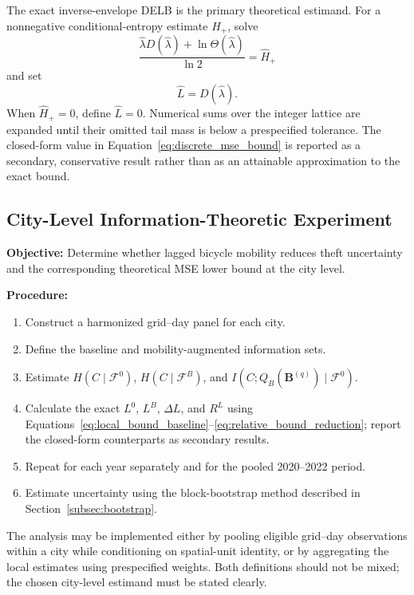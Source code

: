 \documentclass[applsci,article,submit,moreauthors]{Definitions/mdpi}
\begin{document}
The exact inverse-envelope DELB is the primary theoretical estimand. For a
nonnegative conditional-entropy estimate \(\widehat{H}_{+}\), solve
\begin{equation}
\frac{
\widehat{\lambda}D(\widehat{\lambda})
+
\ln\Theta(\widehat{\lambda})
}{\ln2}
=
\widehat{H}_{+}
\label{eq:numerical_inverse_envelope}
\end{equation}
and set
\begin{equation}
\widehat{L}
=
D(\widehat{\lambda}).
\label{eq:estimated_exact_delb}
\end{equation}
When \(\widehat{H}_{+}=0\), define \(\widehat{L}=0\). Numerical sums over
the integer lattice are expanded until their omitted tail mass is below a
prespecified tolerance. The closed-form value in
Equation~\eqref{eq:discrete_mse_bound} is reported as a secondary,
conservative result rather than as an attainable approximation to the exact
bound.

\subsection{City-Level Information-Theoretic Experiment}
\label{subsec:city_level_experiment}

\textbf{Objective:} Determine whether lagged bicycle mobility reduces theft uncertainty and the corresponding theoretical MSE lower bound at the city level.

\textbf{Procedure:}
\begin{enumerate}
    \item Construct a harmonized grid--day panel for each city.
    \item Define the baseline and mobility-augmented information sets.
    \item Estimate \(H(C\mid\mathcal{F}^{0})\), \(H(C\mid\mathcal{F}^{B})\), and \(I(C;Q_B(\mathbf{B}^{(q)})\mid\mathcal{F}^{0})\).
    \item Calculate the exact \(L^{0}\), \(L^{B}\), \(\Delta L\), and \(R^{L}\) using Equations~\eqref{eq:local_bound_baseline}--\eqref{eq:relative_bound_reduction}; report the closed-form counterparts as secondary results.
    \item Repeat for each year separately and for the pooled 2020--2022 period.
    \item Estimate uncertainty using the block-bootstrap method described in Section~\ref{subsec:bootstrap}.
\end{enumerate}

The analysis may be implemented either by pooling eligible grid--day observations within a city while conditioning on spatial-unit identity, or by aggregating the local estimates using prespecified weights. Both definitions should not be mixed; the chosen city-level estimand must be stated clearly.
\end{document}
